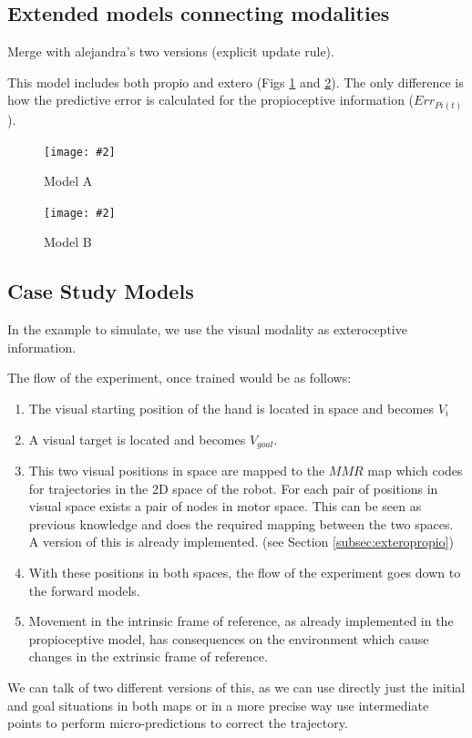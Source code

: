 \documentclass[11pt]{llncs}
\newcommand{\figone}[4]{
  \begin{figure}[ht]
  \begin{center}
  \texttt{[image: \#2]}
  \begin{sl}


    \caption{\label{#1}#3}
  \end{sl}
  \end{center}
  \end{figure}
}
\newcommand{\figtikz}[4]{
\begin{figure}[ht]
\begin{center}
\scalebox{#4}{}
\begin{sl}
\caption{\label{#1}#3}
\end{sl}
\end{center}
\end{figure}
}
\begin{document}
\subsection{Extended models connecting modalities}

Merge with alejandra's two versions (explicit update rule).

This model includes both propio and extero (Figs \ref{fig:basic1}
and \ref{fig:basic2}). The only difference is how the 
predictive error is calculated for the propioceptive information ($Err_{Pi(t)}$).


\figone{fig:basic1}{Integral_v3}{Model A}{0.8}
\figone{fig:basic2}{Integral_v4}{Model B}{0.8}

\subsection{Case Study Models}

In the example to simulate, we use the visual modality as exteroceptive
information. 

The flow of the experiment, once trained would be as follows:

\begin{enumerate}
\item The visual starting position of the hand is located in space and becomes $V_i$
\item A visual target is located and becomes $V_{goal}$.
\item This two visual positions in space are mapped to the  $MMR$ map which
  codes for trajectories in the 2D space of the robot. For each pair of
  positions in visual space exists a pair of nodes in motor space. This can be
  seen as previous knowledge  and does the required mapping between the two
  spaces. A version of this is already implemented. (see Section \ref{subsec:exteropropio})
\item With these positions in both spaces, the flow of the experiment goes
  down to the forward models. 
\item Movement in the intrinsic frame of reference, as already implemented in the propioceptive model, has
  consequences on the environment which cause changes in the extrinsic frame
  of reference.  

\end{enumerate}

We can talk of two different versions of this, as we can use directly just the
initial and goal situations in both maps or in a more precise way use
intermediate points to perform micro-predictions to correct the trajectory.
\end{document}
